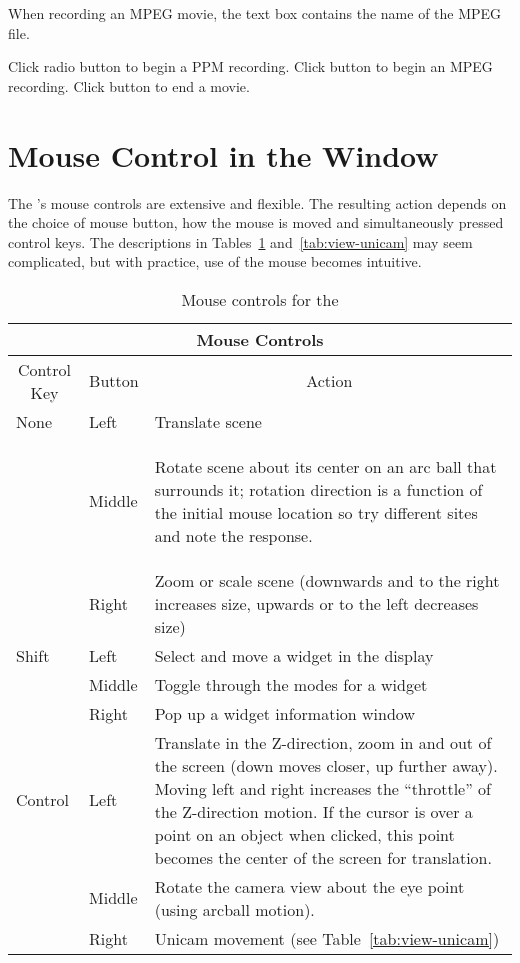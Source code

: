 When recording an MPEG movie, the  text box contains
the name of the MPEG file.

Click radio button  to begin a PPM recording.  Click
button  to begin an MPEG recording.  Click button
 to end a movie.


\section{Mouse Control in the \viewer{} Window}
\label{sec:view-mouse} 

The \viewer{}'s mouse controls are extensive and flexible.  The
resulting action depends on the choice of mouse button, how the mouse
is moved and simultaneously pressed control keys.  The descriptions in
Tables~\ref{tab:view-mouse} and~\ref{tab:view-unicam} may seem
complicated, but with practice, use of the mouse becomes intuitive.


\begin{table}[htb]
\begin{center}
  \begin{tabular}{|l|l|p{5in}|} \hline
    \multicolumn{3}{|c|}{\large Mouse Controls}\\ \hline \hline 
    \multicolumn{1}{|c|}{Control Key} & 
    \multicolumn{1}{|c|}{Button} & 
    \multicolumn{1}{|c|}{Action}\\ \hline
None & Left & Translate scene \\
     & Middle & \begin{raggedleft} Rotate scene about its center on an arc
    ball that surrounds it; rotation direction is a function of the
    initial mouse location so try different sites and note the
    response. \end{raggedleft}\\  
     & Right & Zoom or scale scene (downwards and to the right increases
     size, upwards or to the left decreases size) \\ \hline
Shift & Left & Select and move a widget in the display \\
      & Middle & Toggle through the modes for a widget \\
      & Right & Pop up a widget information window \\ \hline
Control & Left & Translate in the Z-direction, \ie{} zoom in and out of the
    screen (down moves closer, up further away).  Moving left and
    right increases the ``throttle'' of the Z-direction motion.  If
    the cursor is over a point on an object when clicked, this point
    becomes the center of the screen for translation.\\ 
      & Middle & Rotate the camera view about the eye point (using arcball
    motion). \\ 
      & Right & Unicam movement (see Table~\ref{tab:view-unicam})\\ \hline
\end{tabular}
\caption{\label{tab:view-mouse} Mouse controls for the \viewer{}}
\end{center}
\end{table}

